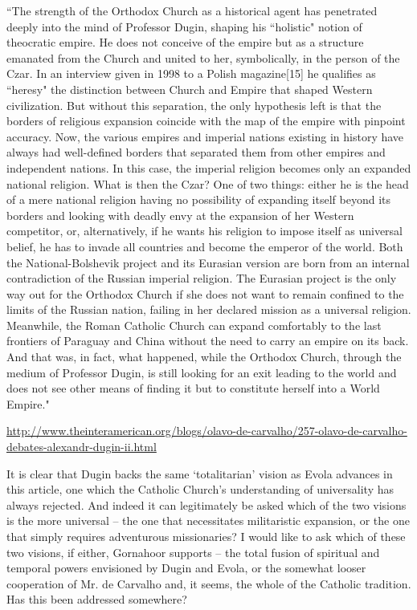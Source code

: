 \begin{footnotesize}
\begin{sffamily}
``The strength of the Orthodox Church as a historical agent has penetrated deeply into the mind of Professor Dugin, shaping his ``holistic" notion of theocratic empire. He does not conceive of the empire but as a structure emanated from the Church and united to her, symbolically, in the person of the Czar. In an interview given in 1998 to a Polish magazine[15] he qualifies as ``heresy" the distinction between Church and Empire that shaped Western civilization. But without this separation, the only hypothesis left is that the borders of religious expansion coincide with the map of the empire with pinpoint accuracy. Now, the various empires and imperial nations existing in history have always had well-defined borders that separated them from other empires and independent nations. In this case, the imperial religion becomes only an expanded national religion. What is then the Czar? One of two things: either he is the head of a mere national religion having no possibility of expanding itself beyond its borders and looking with deadly envy at the expansion of her Western competitor, or, alternatively, if he wants his religion to impose itself as universal belief, he has to invade all countries and become the emperor of the world. Both the National-Bolshevik project and its Eurasian version are born from an internal contradiction of the Russian imperial religion. The Eurasian project is the only way out for the Orthodox Church if she does not want to remain confined to the limits of the Russian nation, failing in her declared mission as a universal religion. Meanwhile, the Roman Catholic Church can expand comfortably to the last frontiers of Paraguay and China without the need to carry an empire on its back. And that was, in fact, what happened, while the Orthodox Church, through the medium of Professor Dugin, is still looking for an exit leading to the world and does not see other means of finding it but to constitute herself into a World Empire."

\url{http://www.theinteramerican.org/blogs/olavo-de-carvalho/257-olavo-de-carvalho-debates-alexandr-dugin-ii.html}

It is clear that Dugin backs the same `totalitarian' vision as Evola advances in this article, one which the Catholic Church's understanding of universality has always rejected. And indeed it can legitimately be asked which of the two visions is the more universal – the one that necessitates militaristic expansion, or the one that simply requires adventurous missionaries? I would like to ask which of these two visions, if either, Gornahoor supports – the total fusion of spiritual and temporal powers envisioned by Dugin and Evola, or the somewhat looser cooperation of Mr. de Carvalho and, it seems, the whole of the Catholic tradition. Has this been addressed somewhere?



\end{sffamily}
\end{footnotesize}
